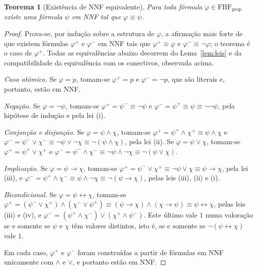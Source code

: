 \documentclass[12pt,a4paper,oneside]{report}
\theoremstyle{tituloplain}
\newtheorem{teorema}{Teorema}[chapter]
\theoremstyle{titulodef}
\begin{document}
\begin{teorema}[Existência de NNF equivalente]\label{teo:nnf}
Para toda fórmula $\varphi\in\mathrm{FBF}_{\mathrm{prop}}$ existe uma fórmula $\psi$ em NNF tal que $\varphi\equiv\psi$.
\end{teorema}
\begin{proof}
Prova-se, por indução sobre a estrutura de $\varphi$, a afirmação mais forte de que existem fórmulas $\varphi^{+}$ e $\varphi^{-}$ em NNF tais que $\varphi^{+}\equiv\varphi$ e $\varphi^{-}\equiv\neg\varphi$; o teorema é o caso de $\varphi^{+}$. Todas as equivalências abaixo decorrem do Lema~\ref{lem:leis} e da compatibilidade da equivalência com os conectivos, observada acima.

\emph{Caso atômico.} Se $\varphi=p$, tomam-se $\varphi^{+}=p$ e $\varphi^{-}=\neg p$, que são literais e, portanto, estão em NNF.

\emph{Negação.} Se $\varphi=\neg\psi$, tomam-se $\varphi^{+}=\psi^{-}\equiv\neg\psi$ e $\varphi^{-}=\psi^{+}\equiv\psi\equiv\neg\neg\psi$, pela hipótese de indução e pela lei (i).

\emph{Conjunção e disjunção.} Se $\varphi=\psi\wedge\chi$, tomam-se $\varphi^{+}=\psi^{+}\wedge\chi^{+}\equiv\psi\wedge\chi$ e $\varphi^{-}=\psi^{-}\vee\chi^{-}\equiv\neg\psi\vee\neg\chi\equiv\neg(\psi\wedge\chi)$, pela lei (ii). Se $\varphi=\psi\vee\chi$, tomam-se $\varphi^{+}=\psi^{+}\vee\chi^{+}$ e $\varphi^{-}=\psi^{-}\wedge\chi^{-}\equiv\neg\psi\wedge\neg\chi\equiv\neg(\psi\vee\chi)$.

\emph{Implicação.} Se $\varphi=\psi\rightarrow\chi$, tomam-se $\varphi^{+}=\psi^{-}\vee\chi^{+}\equiv\neg\psi\vee\chi\equiv\psi\rightarrow\chi$, pela lei (iii), e $\varphi^{-}=\psi^{+}\wedge\chi^{-}\equiv\psi\wedge\neg\chi\equiv\neg(\psi\rightarrow\chi)$, pelas leis (iii), (ii) e (i).

\emph{Bicondicional.} Se $\varphi=\psi\leftrightarrow\chi$, tomam-se $\varphi^{+}=(\psi^{-}\vee\chi^{+})\wedge(\chi^{-}\vee\psi^{+})\equiv(\psi\rightarrow\chi)\wedge(\chi\rightarrow\psi)\equiv\psi\leftrightarrow\chi$, pelas leis (iii) e (iv), e $\varphi^{-}=(\psi^{+}\wedge\chi^{-})\vee(\chi^{+}\wedge\psi^{-})$. Este último vale $1$ numa valoração se e somente se $\psi$ e $\chi$ têm valores distintos, isto é, se e somente se $\neg(\psi\leftrightarrow\chi)$ vale $1$.

Em cada caso, $\varphi^{+}$ e $\varphi^{-}$ foram construídas a partir de fórmulas em NNF unicamente com $\wedge$ e $\vee$, e portanto estão em NNF.
\end{proof}
\end{document}
